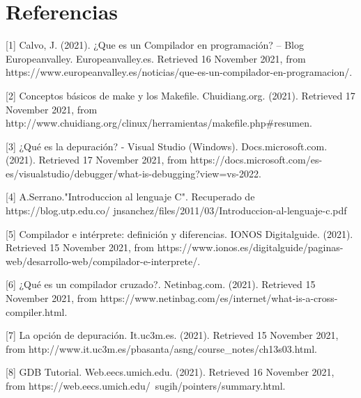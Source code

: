 \documentclass[12pt,a4paper]{article}
\begin{document}
\section{Referencias}

[1] Calvo, J. (2021). ¿Que es un Compilador en programación? – Blog Europeanvalley. Europeanvalley.es. Retrieved 16 November 2021, from https://www.europeanvalley.es/noticias/que-es-un-compilador-en-programacion/.

[2] Conceptos básicos de make y los Makefile. Chuidiang.org. (2021). Retrieved 17 November 2021, from http://www.chuidiang.org/clinux/herramientas/makefile.php#resumen.

[3] ¿Qué es la depuración? - Visual Studio (Windows). Docs.microsoft.com. (2021). Retrieved 17 November 2021, from https://docs.microsoft.com/es-es/visualstudio/debugger/what-is-debugging?view=vs-2022.

[4] A.Serrano."Introduccion al lenguaje C". Recuperado de https://blog.utp.edu.co/
jnsanchez/files/2011/03/Introduccion-al-lenguaje-c.pdf

[5] Compilador e intérprete: definición y diferencias. IONOS Digitalguide. (2021). Retrieved 15 November 2021, from https://www.ionos.es/digitalguide/paginas-web/desarrollo-web/compilador-e-interprete/.

[6] ¿Qué es un compilador cruzado?. Netinbag.com. (2021). Retrieved 15 November 2021, from https://www.netinbag.com/es/internet/what-is-a-cross-compiler.html.

[7] La opción de depuración. It.uc3m.es. (2021). Retrieved 15 November 2021, from http://www.it.uc3m.es/pbasanta/asng/course_notes/ch13s03.html.

[8] GDB Tutorial. Web.eecs.umich.edu. (2021). Retrieved 16 November 2021, from https://web.eecs.umich.edu/~sugih/pointers/summary.html.
\end{document}
